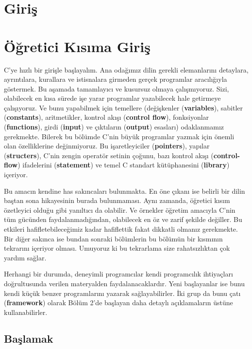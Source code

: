 \documentclass[a4paper,12pt,oneside]{book}
\begin{document}
\mainmatter

\chapter*{Giriş}



\chapter{Öğretici Kısıma Giriş}
C'ye hızlı bir girişle başlayalım. Ana odağımız dilin gerekli elemanlarını detaylara, ayrıntılara, kurallara ve istisnalara girmeden gerçek programlar aracılığıyla göstermek. Bu aşamada tamamlayıcı ve kusursuz olmaya çalışmıyoruz. Sizi, olabilecek en kısa sürede işe yarar programlar yazabilecek hale getirmeye çalışıyoruz. Ve bunu yapabilmek için temellere (değişkenler (\textbf{variables}), sabitler (\textbf{constants}), aritmetikler, kontrol akışı (\textbf{control flow}), fonksiyonlar (\textbf{functions}), girdi (\textbf{input}) ve çıktıların (\textbf{output}) esasları) odaklanmamız gerekmekte. Bilerek bu bölümde C'nin büyük programlar yazmak için önemli olan özelliklerine değinmiyoruz. Bu işaretleyiciler (\textbf{pointers}), yapılar (\textbf{structers}), C'nin zengin operatör setinin çoğunu, bazı kontrol akışı (\textbf{control-flow}) ifadelerini (\textbf{statement}) ve temel C standart kütüphanesini (\textbf{library}) içeriyor.
\par Bu amacın kendine has sakıncaları bulunmakta. En öne çıkanı ise belirli bir dilin baştan sona hikayesinin burada bulunmaması. Aynı zamanda, öğretici kısım özetleyici olduğu gibi yanıltıcı da olabilir. Ve örnekler öğretim amacıyla C'nin tüm gücünden faydalanmadığından, olabilecek en öz ve zarif şekilde değiller. Bu etkileri hafifletebileceğimiz kadar hafiflettik fakat dikkatli olmanız gerekmekte. Bir diğer sakınca ise bundan sonraki bölümlerin bu bölümün bir kısmının tekrarını içeriyor olması. Umuyoruz ki bu tekrarlama size rahatsızlıktan çok yardım sağlar.
\par Herhangi bir durumda, deneyimli programcılar kendi programcılık ihtiyaçları doğrultusunda verilen materyalden faydalanacaklardır. Yeni başlayanlar ise bunu kendi küçük benzer programlarını yazarak sağlayabilirler. İki grup da bunu çatı (\textbf{framework}) olarak Bölüm 2'de başlayan daha detaylı açıklamaların üstüne kullanabilirler. \pagebreak

\section{Başlamak}
\end{document}
